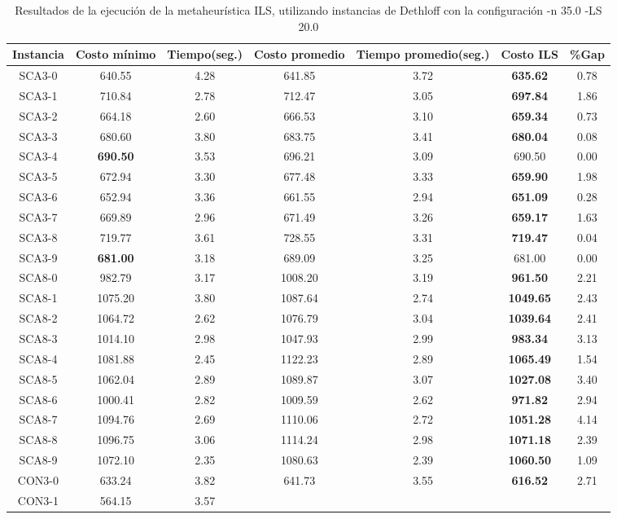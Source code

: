 \begin{table}[ht]
\caption{Resultados de la ejecución de la metaheurística ILS, utilizando instancias de Dethloff con la configuración -n 35.0 -LS 20.0}
\centering
\small
\begin{tabular}{c c c c c c c}
\hline\hline
Instancia & Costo mínimo & Tiempo(seg.) & Costo promedio & Tiempo promedio(seg.) & Costo ILS & \%Gap \\ [0.5ex]
\hline
SCA3-0 & 640.55 & 4.28 & 
641.85 & 3.72 & \bf{635.62} & 
0.78\\SCA3-1 & 710.84 & 2.78 & 
712.47 & 3.05 & \bf{697.84} & 
1.86\\SCA3-2 & 664.18 & 2.60 & 
666.53 & 3.10 & \bf{659.34} & 
0.73\\SCA3-3 & 680.60 & 3.80 & 
683.75 & 3.41 & \bf{680.04} & 
0.08\\SCA3-4 & \bf{690.50} & 3.53 & 
696.21 & 3.09 & 690.50 & 0.00\\
SCA3-5 & 672.94 & 3.30 & 
677.48 & 3.33 & \bf{659.90} & 
1.98\\SCA3-6 & 652.94 & 3.36 & 
661.55 & 2.94 & \bf{651.09} & 
0.28\\SCA3-7 & 669.89 & 2.96 & 
671.49 & 3.26 & \bf{659.17} & 
1.63\\SCA3-8 & 719.77 & 3.61 & 
728.55 & 3.31 & \bf{719.47} & 
0.04\\SCA3-9 & \bf{681.00} & 3.18 & 
689.09 & 3.25 & 681.00 & 0.00\\
SCA8-0 & 982.79 & 3.17 & 
1008.20 & 3.19 & \bf{961.50} & 
2.21\\SCA8-1 & 1075.20 & 3.80 & 
1087.64 & 2.74 & \bf{1049.65} & 
2.43\\SCA8-2 & 1064.72 & 2.62 & 
1076.79 & 3.04 & \bf{1039.64} & 
2.41\\SCA8-3 & 1014.10 & 2.98 & 
1047.93 & 2.99 & \bf{983.34} & 
3.13\\SCA8-4 & 1081.88 & 2.45 & 
1122.23 & 2.89 & \bf{1065.49} & 
1.54\\SCA8-5 & 1062.04 & 2.89 & 
1089.87 & 3.07 & \bf{1027.08} & 
3.40\\SCA8-6 & 1000.41 & 2.82 & 
1009.59 & 2.62 & \bf{971.82} & 
2.94\\SCA8-7 & 1094.76 & 2.69 & 
1110.06 & 2.72 & \bf{1051.28} & 
4.14\\SCA8-8 & 1096.75 & 3.06 & 
1114.24 & 2.98 & \bf{1071.18} & 
2.39\\SCA8-9 & 1072.10 & 2.35 & 
1080.63 & 2.39 & \bf{1060.50} & 
1.09\\CON3-0 & 633.24 & 3.82 & 
641.73 & 3.55 & \bf{616.52} & 
2.71\\CON3-1 & 564.15 & 3.57 & 

\end{tabular}
\end{table}
